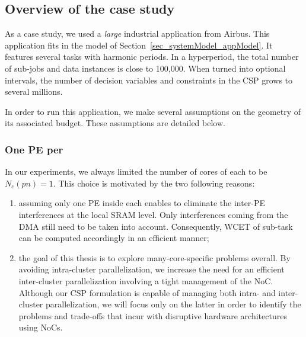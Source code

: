 \documentclass[main.tex]{subfiles}
\begin{document}
\subsection{Overview of the case study}
As a case study, we used a \emph{large} industrial application from Airbus.
This application fits in the model of Section~\ref{sec_systemModel_appModel}.
It features several tasks with harmonic periods. In a hyperperiod, the total
number of sub-jobs and data instances is close to 100,000. When turned into
optional intervals, the number of decision variables and constraints in the CSP
grows to several millions. 

In order to run this application, we make several assumptions on the geometry
of its associated budget. These assumptions are detailed below.

\subsubsection{One PE per \PN{}}
In our experiments, we always limited the number of cores of each \PN{} to be
$N_c(pn)=1$. This choice is motivated by the two following reasons:
\begin{enumerate}
    \item assuming only one PE inside each \PN{} enables to eliminate the
        inter-PE interferences at the local SRAM level. Only interferences
        coming from the DMA still need to be taken into account. Consequently,
        WCET of sub-task can be computed accordingly in an efficient manner;
    \item the goal of this thesis is to explore many-core-specific problems
        overall. By avoiding intra-cluster parallelization, we increase the
        need for an efficient inter-cluster parallelization involving a tight
        management of the NoC. Although our CSP formulation is capable of
        managing both intra- and inter-cluster parallelization, we will focus
        only on the latter in order to identify the problems and trade-offs
        that incur with disruptive hardware architectures using NoCs.
\end{enumerate}
\end{document}
